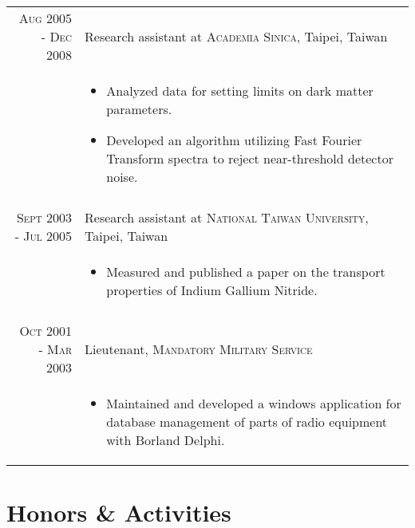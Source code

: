 \documentclass[11pt]{article} %
\begin{document}
\begin{tabular}{r|p{12cm}}
\textsc{Aug 2005 - Dec 2008} & Research assistant at \textsc{Academia Sinica}, Taipei, Taiwan \\
& \small
\begin{itemize}
  \item Analyzed data for setting limits on dark matter parameters.
  \item Developed an algorithm utilizing Fast Fourier Transform spectra to reject near-threshold detector noise.
\end{itemize}
\\
\multicolumn{2}{c}{} \\


\textsc{Sept 2003 - Jul 2005} & Research assistant at \textsc{National Taiwan University}, Taipei, Taiwan \\
& \small
\begin{itemize}
  \item Measured and published a paper on the transport properties of Indium Gallium Nitride.
\end{itemize}
\\
\multicolumn{2}{c}{} \\


\textsc{Oct 2001 - Mar 2003} & Lieutenant, \textsc{Mandatory Military Service} \\
& \small
\begin{itemize}
  \item Maintained and developed a windows application for database management of parts of radio equipment with Borland Delphi.
\end{itemize}

\end{tabular}



\section{Honors \& Activities}
\end{document}
